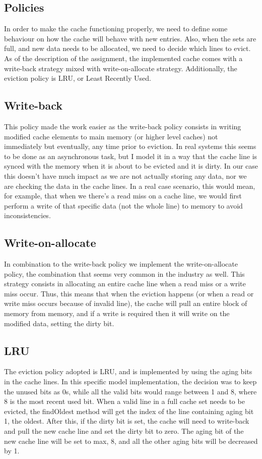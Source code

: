 \subsection{Policies}
    In order to make the cache functioning properly, we need to define some behaviour on how the cache will behave with new entries. Also, when the sets are full, and new data needs to be allocated, we need to decide which lines to evict. As of the description of the assignment, the implemented cache comes with a write-back strategy mixed with write-on-allocate strategy. Additionally, the eviction policy is LRU, or Least Recently Used. 

\subsection{Write-back}
This policy made the work easier as the write-back policy consists in writing modified cache elements to main memory (or higher level caches) not immediately but eventually, any time prior to eviction. In real systems this seems to be done as an asynchronous task, but I model it in a way that the cache line is synced with the memory when it is about to be evicted and it is dirty. In our case this doesn’t have much impact as we are not actually storing any data, nor we are checking the data in the cache lines. In a real case scenario, this would mean, for example, that when we there’s a read miss on a cache line, we would first perform a write of that specific data (not the whole line) to memory to avoid inconsistencies.
\subsection{Write-on-allocate}
    In combination to the write-back policy we implement the write-on-allocate policy, the combination that seems very common in the industry as well. This strategy consists in allocating an entire cache line when a read miss or a write miss occur. Thus, this means that when the eviction happens (or when a read or write miss occurs because of invalid line), the cache will pull an entire block of memory from memory, and if a write is required then it will write on the modified data, setting the dirty bit. 
\subsection{LRU}
The eviction policy adopted is LRU, and is implemented by using the aging bits in the cache lines. In this specific model implementation, the decision was to keep the unused bits as 0s, while all the valid bits would range between 1 and 8, where 8 is the most recent used bit. When a valid line in a full cache set needs to be evicted, the findOldest method will get the index of the line containing aging bit 1, the oldest. After this, if the dirty bit is set, the cache will need to write-back and pull the new cache line and set the dirty bit to zero. The aging bit of the new cache line will be set to max, 8, and all the other aging bits will be decreased by 1. 


